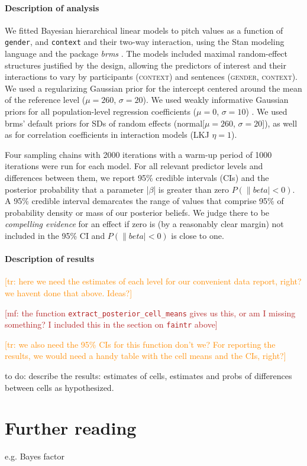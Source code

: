 \documentclass[nobib]{tufte-handout}
\renewcommand{\mf}[1]{\textcolor{firebrick}{[mf: #1]}}
\newcommand{\tr}[1]{\textcolor{DarkOrange}{[tr: #1]}}
\begin{document}
\paragraph{Description of analysis}  
We fitted Bayesian hierarchical linear models to pitch values as a function of \texttt{gender}, and \texttt{context} and their two-way interaction, using the Stan modeling language \citep{carpenter2016stan} and the package \emph{brms} \citep{buerkner2016brms}.
The models included maximal random-effect structures justified by the design, allowing the predictors of interest and their interactions to vary by participants (\textsc{context}) and sentences (\textsc{gender}, \textsc{context}).
We used a regularizing Gaussian prior for the intercept  centered around the mean of the reference level ($\mu = 260$, $\sigma = 20$). We used weakly informative Gaussian priors for all population-level regression coefficients ($\mu = 0$, $\sigma = 10$) . We used brms' default priors for SDs of random effects (normal[$\mu = 260$,  $\sigma = 20$]), as well as for correlation coefficients in interaction models (LKJ $\eta = 1$).

Four sampling chains with 2000 iterations with a warm-up period of 1000 iterations were run for each model. 
For all relevant predictor levels and differences between them, we report 95\% credible
intervals (CIs) and the posterior probability that a parameter |$\beta$| is greater than zero $P(\|beta| < 0)$. A 95\% credible interval demarcates the range of values that comprise 95\% of probability density or mass of our posterior beliefs. We judge there to be \emph{compelling evidence
} for an effect if zero is (by a reasonably clear margin) not included in the 95\% CI and $P(\|beta| < 0)$ is close to one.

\paragraph{Description of results}  
\tr{here we need the estimates of each level for our convenient data report, right? we havent done that above. Ideas?}

\mf{the function \texttt{extract\_posterior\_cell\_means} gives us this, or am I missing something? I included this in the section on \texttt{faintr} above}

\tr{we also need the 95\% CIs for this function don't we? For reporting the results, we would need a handy table with the cell means and the CIs, right?}

to do: describe the results: estimates of cells, estimates and probs of differences between cells as hypothesized.

\section{Further reading}
e.g. Bayes factor





\printbibliography[heading=bibintoc]
\end{document}
